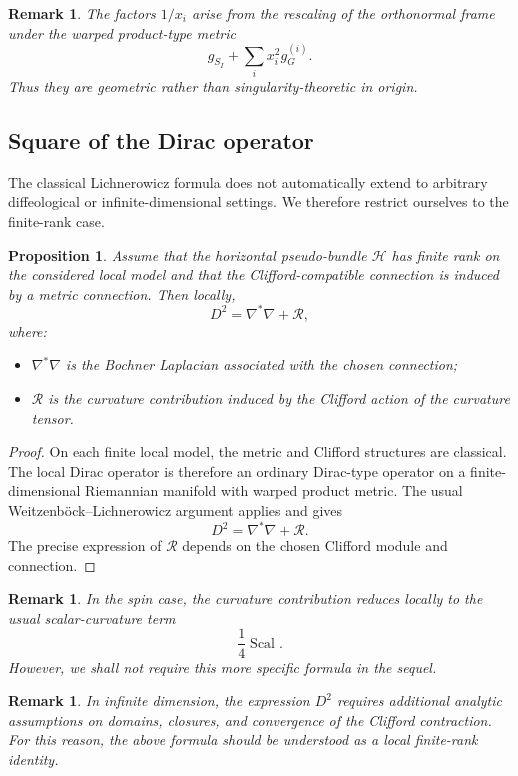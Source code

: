 \documentclass[11pt]{amsart}
\newtheorem{proposition}[theorem]{Proposition}
\newtheorem{remark}[theorem]{Remark}
\begin{document}
\begin{remark}
The factors \(1/x_i\) arise from the rescaling of the orthonormal frame under
the warped product-type metric
\[
g_{S_I}+\sum_i x_i^2 g_G^{(i)}.
\]
Thus they are geometric rather than singularity-theoretic in origin.
\end{remark}

\subsection{Square of the Dirac operator}

The classical Lichnerowicz formula does not automatically extend to arbitrary
diffeological or infinite-dimensional settings. We therefore restrict
ourselves to the finite-rank case.

\begin{proposition}
Assume that the horizontal pseudo-bundle \(\mathcal H\) has finite rank on the
considered local model and that the Clifford-compatible connection is induced
by a metric connection. Then locally,
\[
D^2
=
\nabla^*\nabla
+
\mathcal R,
\]
where:
\begin{itemize}
\item \(\nabla^*\nabla\) is the Bochner Laplacian associated with the chosen
connection;
\item \(\mathcal R\) is the curvature contribution induced by the Clifford
action of the curvature tensor.
\end{itemize}
\end{proposition}

\begin{proof}
On each finite local model, the metric and Clifford structures are classical.
The local Dirac operator is therefore an ordinary Dirac-type operator on a
finite-dimensional Riemannian manifold with warped product metric. The usual
Weitzenböck--Lichnerowicz argument applies and gives
\[
D^2
=
\nabla^*\nabla+\mathcal R.
\]
The precise expression of \(\mathcal R\) depends on the chosen Clifford module
and connection.
\end{proof}

\begin{remark}
In the spin case, the curvature contribution reduces locally to the usual
scalar-curvature term
\[
\frac14\operatorname{Scal}.
\]
However, we shall not require this more specific formula in the sequel.
\end{remark}

\begin{remark}
In infinite dimension, the expression \(D^2\) requires additional analytic
assumptions on domains, closures, and convergence of the Clifford contraction.
For this reason, the above formula should be understood as a local
finite-rank identity.
\end{remark}
\end{document}
